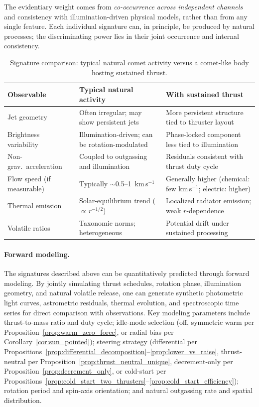 \documentclass{article}
\begin{document}
The evidentiary weight comes from \emph{co-occurrence across independent channels} and consistency with illumination-driven physical models, rather than from any single feature. Each individual signature can, in principle, be produced by natural processes; the discriminating power lies in their joint occurrence and internal consistency.

\begin{table}[h!]
\caption{Signature comparison: typical natural comet activity versus a comet-like body hosting sustained thrust.}
\label{tab:signatures}
\centering
\scriptsize
\setlength{\tabcolsep}{3pt}
\renewcommand{\arraystretch}{1.06}
\begin{tabular}{@{}p{}p{}p{}@{}}
\toprule
Observable & Typical natural activity & With sustained thrust \\
\midrule
Jet geometry &
Often irregular; may show persistent jets &
More persistent structure tied to thruster layout \\
Brightness variability &
Illumination-driven; can be rotation-modulated &
Phase-locked component less tied to illumination \\
Non-grav.\ acceleration &
Coupled to outgassing and illumination &
Residuals consistent with thrust duty cycle \\
Flow speed (if measurable) &
Typically $\sim$0.5--1~km\,s$^{-1}$ &
Generally higher (chemical: few km\,s$^{-1}$; electric: higher) \\
Thermal emission &
Solar-equilibrium trend ($\propto r^{-1/2}$) &
Localized radiator emission; weak $r$-dependence \\
Volatile ratios &
Taxonomic norms; heterogeneous &
Potential drift under sustained processing \\
\bottomrule
\end{tabular}
\end{table}

\paragraph{Forward modeling.}

The signatures described above can be quantitatively predicted through forward modeling. By jointly simulating thrust schedules, rotation phase, illumination geometry, and natural volatile release, one can generate synthetic photometric light curves, astrometric residuals, thermal evolution, and spectroscopic time series for direct comparison with observations. Key modeling parameters include thrust-to-mass ratio and duty cycle; idle-mode selection (off, symmetric warm per Proposition~\ref{prop:warm_zero_force}, or radial bias per Corollary~\ref{cor:sun_pointed}); steering strategy (differential per Propositions~\ref{prop:differential_decomposition}--\ref{prop:lower_vs_raise}, thrust-neutral per Proposition~\ref{prop:thrust_neutral_unique}, decrement-only per Proposition~\ref{prop:decrement_only}, or cold-start per Propositions~\ref{prop:cold_start_two_thrusters}--\ref{prop:cold_start_efficiency}); rotation period and spin-axis orientation; and natural outgassing rate and spatial distribution.
\end{document}

